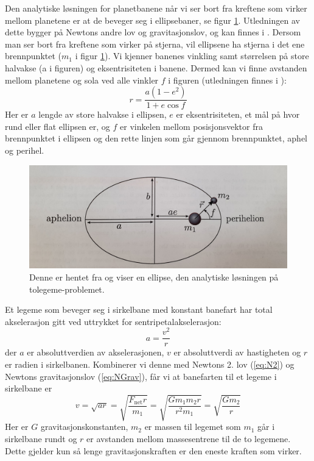 \documentclass[reprint,english,notitlepage]{revtex4-1}  %
\begin{document}
Den analytiske løsningen for planetbanene når vi ser bort fra kreftene som virker mellom planetene er at de beveger seg i ellipsebaner, se figur \ref{fig:ellipse}. Utledningen av dette bygger på Newtons andre lov og gravitasjonslov, og kan finnes i \citep{part1B}. Dersom man ser bort fra kreftene som virker på stjerna, vil ellipsene ha stjerna i det ene brennpunktet ($m_1$ i figur \ref{fig:ellipse}). Vi kjenner banenes vinkling samt størrelsen på store halvakse (a i figuren) og eksentrisiteten i banene. Dermed kan vi finne avstanden mellom planetene og sola ved alle vinkler $f$ i figuren (utledningen finnes i \citep{part1B}):
 \begin{equation}
   \label{eq:analytical_ellipse}
   r = \frac{a(1 - e^2)}{1 + e \cos{f}}
 \end{equation}
 Her er $a$ lengde av store halvakse i ellipsen, $e$ er eksentrisiteten, et mål på hvor rund eller flat ellipsen er, og $f$ er vinkelen mellom posisjonsvektor fra brennpunktet i ellipsen og den rette linjen som går gjennom brennpunktet, aphel og perihel.

\begin{figure}
  \includegraphics[width=\linewidth]{output/ellipse.jpg}
  \caption{Denne er hentet fra \citep{part1B} og viser en ellipse, den analytiske løsningen på tolegeme-problemet.}
  \label{fig:ellipse}
\end{figure}

Et legeme som beveger seg i sirkelbane med konstant banefart har total akselerasjon gitt ved uttrykket for sentripetalakselerasjon:
 \begin{equation}
   \label{eq:sentripetalakselerasjon}
   a = \frac{v^2}{r}
 \end{equation}
 der $a$ er absoluttverdien av akselerasjonen, $v$ er absoluttverdi av hastigheten og $r$ er radien i sirkelbanen. Kombinerer vi denne med Newtons 2. lov (\ref{eq:N2}) og Newtons gravitasjonslov (\ref{eq:NGrav}), får vi at banefarten til et legeme i sirkelbane er
 \begin{equation}
   \label{eq:banefart}
   v = \sqrt{ar} = \sqrt{\frac{F_{\text{net}}r}{m_1}} = \sqrt{\frac{G m_1 m_2 r}{r^2 m_1}} = \sqrt{\frac{G m_2}{r}}
 \end{equation}
 Her er $G$ gravitasjonskonstanten, $m_2$ er massen til legemet som $m_1$ går i sirkelbane rundt og $r$ er avstanden mellom massesentrene til de to legemene. Dette gjelder kun så lenge gravitasjonskraften er den eneste kraften som virker.
\end{document}
